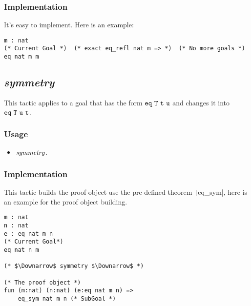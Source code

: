 \subsubsection*{Implementation}
It's easy to implement. Here is an example:
\begin{center}
\begin{minipage}{0.8\textwidth}
\begin{verbatim}
m : nat                                                      
(* Current Goal *)  (* exact eq_refl nat m => *)  (* No more goals *)
eq nat m m                                       
\end{verbatim}
\end{minipage}
\end{center}


\subsection{\it symmetry}
This tactic applies to a goal that has the form $\tt eq\ T\ t\ u$ 
and changes it into $\tt eq\ T\ u\ t$.

\subsubsection*{Usage}
\begin{itemize}
\item ${\it symmetry}$.
\end{itemize}

\subsubsection*{Implementation}
This tactic builds the proof object use the pre-defined theorem \texttt|eq_sym|, here is an example for the proof object building.
\begin{center}
\begin{minipage}{0.6\textwidth}
\begin{verbatim}
m : nat
n : nat
e : eq nat m n                    
(* Current Goal*)                              
eq nat n m                           

(* $\Downarrow$ symmetry $\Downarrow$ *)   

(* The proof object *)
fun (m:nat) (n:nat) (e:eq nat m n) =>   
    eq_sym nat m n (* SubGoal *)                                                
\end{verbatim}
\end{minipage}
\end{center}


